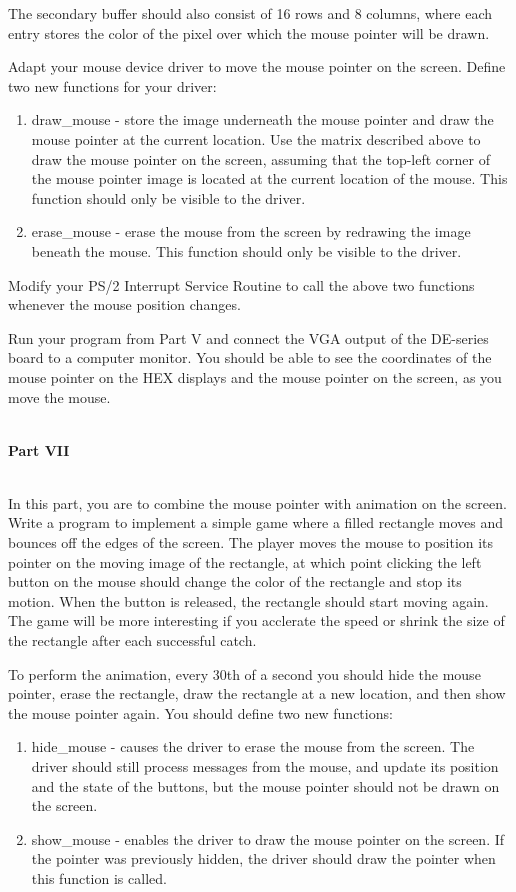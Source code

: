 \documentclass[epsfig,10pt,fullpage]{article}
\begin{document}
\noindent
The secondary buffer should also consist of 16 rows and 8 columns, where each entry stores the color of the pixel over which the mouse pointer will be drawn.

Adapt your mouse device driver to move the mouse pointer on the screen. Define two new functions for your driver:
\begin{enumerate}
	\item draw\_mouse - store the image underneath the mouse pointer and draw the mouse pointer at the current location. Use the matrix described above to draw the mouse pointer on the screen, assuming that the top-left corner of the mouse pointer image is located at the current location of the mouse. This function should only be visible to the driver.
	\item erase\_mouse - erase the mouse from the screen by redrawing the image beneath the mouse. This function should only be visible to the driver. 
\end{enumerate}

\noindent
Modify your PS/2 Interrupt Service Routine to call the above two functions whenever the mouse position changes.

Run your program from Part V and connect the VGA output of the DE-series board to a computer monitor. You should be able to see
the coordinates of the mouse pointer on the HEX displays and the mouse pointer on the screen, as you move the mouse. 
 
~\\
\noindent
{\bf Part VII}

~\\
\noindent
In this part, you are to combine the mouse pointer with animation on the screen. Write a program to implement a simple game where a filled rectangle moves and bounces off the edges of the screen.  The player moves the mouse to position its pointer on the moving image of the rectangle, at which point clicking the left button on the mouse should change the color of the rectangle and stop its motion. When the button is released, the rectangle should start moving again. The game will be more interesting if you acclerate the speed or shrink the size of the rectangle after each successful catch. 

To perform the animation, every 30th of a second you should hide the mouse pointer, erase the rectangle, draw the rectangle at a new location, and then show the mouse pointer again. You should define two new functions:

\begin{enumerate}
	\item hide\_mouse - causes the driver to erase the mouse from the screen. The driver should still process messages from the mouse, and update its position and the state of the buttons, but the mouse pointer should not be drawn on the screen.
	\item show\_mouse - enables the driver to draw the mouse pointer on the screen. If the pointer was previously hidden, the driver should draw the pointer when this function is called.
\end{enumerate}
\end{document}
